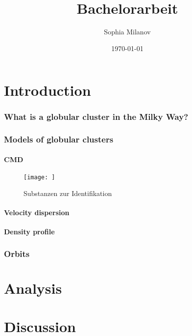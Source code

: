 \documentclass[a4paper,12pt,abstracton]{scrartcl}
\title{Bachelorarbeit}
\author{Sophia Milanov}
\date{\today}
\begin{document}


\begin{abstract}
\Blindtext 
\end{abstract}

\newpage

\tableofcontents


\part{Introduction}
\section{What is a globular cluster in the Milky Way?}
\section{Models of globular clusters}
\subsection{CMD}
\begin{figure}[htbp] 
	\texttt{[image: ]}
	\caption{Substanzen zur Identifikation}
	\label{fig:Abbildung1} 
\end{figure}
\subsection{Velocity dispersion}
\subsection{Density profile}
\section{Orbits}
\part{Analysis}
\part{Discussion}
\end{document}
